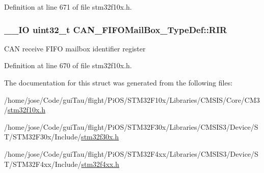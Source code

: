 Definition at line 671 of file stm32f10x.\-h.

\hypertarget{struct_c_a_n___f_i_f_o_mail_box___type_def_a034504d43f7b16b320745a25b3a8f12d}{
\subsubsection[{R\-I\-R}]{\setlength{\rightskip}{0pt plus 5cm}\-\_\-\-\_\-\-I\-O {\bf uint32\-\_\-t} C\-A\-N\-\_\-\-F\-I\-F\-O\-Mail\-Box\-\_\-\-Type\-Def\-::\-R\-I\-R}}\label{struct_c_a_n___f_i_f_o_mail_box___type_def_a034504d43f7b16b320745a25b3a8f12d}
C\-A\-N receive F\-I\-F\-O mailbox identifier register 

Definition at line 670 of file stm32f10x.\-h.



The documentation for this struct was generated from the following files\-:\begin{DoxyCompactItemize}
\item 
/home/jose/\-Code/gui\-Tau/flight/\-Pi\-O\-S/\-S\-T\-M32\-F10x/\-Libraries/\-C\-M\-S\-I\-S/\-Core/\-C\-M3/\hyperlink{stm32f10x_8h}{stm32f10x.\-h}\item 
/home/jose/\-Code/gui\-Tau/flight/\-Pi\-O\-S/\-S\-T\-M32\-F30x/\-Libraries/\-C\-M\-S\-I\-S3/\-Device/\-S\-T/\-S\-T\-M32\-F30x/\-Include/\hyperlink{stm32f30x_8h}{stm32f30x.\-h}\item 
/home/jose/\-Code/gui\-Tau/flight/\-Pi\-O\-S/\-S\-T\-M32\-F4xx/\-Libraries/\-C\-M\-S\-I\-S3/\-Device/\-S\-T/\-S\-T\-M32\-F4xx/\-Include/\hyperlink{stm32f4xx_8h}{stm32f4xx.\-h}\end{DoxyCompactItemize}
